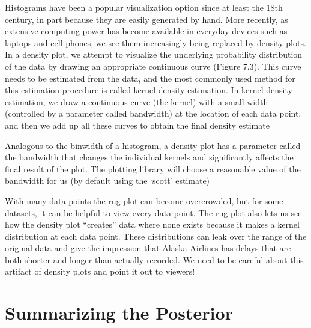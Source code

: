 Histograms have been a popular visualization option since at least the 18th century, in part because they are easily generated by hand. More recently, as extensive computing power has become available in everyday devices such as laptops and cell phones, we see them increasingly being replaced by density plots. In a density plot, we attempt to visualize the underlying probability distribution of the data by drawing an appropriate continuous curve (Figure 7.3). This curve needs to be estimated from the data, and the most commonly used method for this estimation procedure is called kernel density estimation. In kernel density estimation, we draw a continuous curve (the kernel) with a small width (controlled by a parameter called bandwidth) at the location of each data point, and then we add up all these curves to obtain the final density estimate

Analogous to the binwidth of a histogram, a density plot has a parameter called the bandwidth that changes the individual kernels and significantly affects the final result of the plot. The plotting library will choose a reasonable value of the bandwidth for us (by default using the ‘scott’ estimate)

With many data points the rug plot can become overcrowded, but for some datasets, it can be helpful to view every data point. The rug plot also lets us see how the density plot “creates” data where none exists because it makes a kernel distribution at each data point. These distributions can leak over the range of the original data and give the impression that Alaska Airlines has delays that are both shorter and longer than actually recorded. We need to be careful about this artifact of density plots and point it out to viewers!

\section{Summarizing the Posterior}

